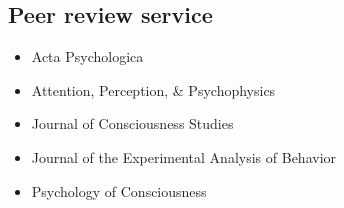\documentclass[12pt, a4paper]{article}
\begin{document}
\subsection*{Peer review service}
\begin{itemize}
\item Acta Psychologica
\item Attention, Perception, \& Psychophysics
\item Journal of Consciousness Studies
\item Journal of the Experimental Analysis of Behavior
\item Psychology of Consciousness
\end{itemize}

\vfill{}
\end{document}
